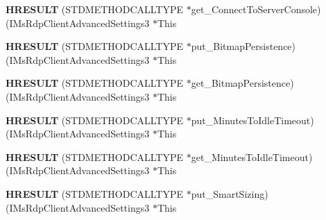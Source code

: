 \begin{DoxyCompactItemize}
\item 
\mbox{\label{struct_i_ms_rdp_client_advanced_settings3_vtbl_a1d1641b79c7c5cf8c25f9c96f7731509}} 
{\bfseries H\+R\+E\+S\+U\+LT} (S\+T\+D\+M\+E\+T\+H\+O\+D\+C\+A\+L\+L\+T\+Y\+PE $\ast$get\+\_\+\+Connect\+To\+Server\+Console)(I\+Ms\+Rdp\+Client\+Advanced\+Settings3 $\ast$This
\item 
\mbox{\label{struct_i_ms_rdp_client_advanced_settings3_vtbl_a71c5797ff242f9ed8fb4dceed7adb61d}} 
{\bfseries H\+R\+E\+S\+U\+LT} (S\+T\+D\+M\+E\+T\+H\+O\+D\+C\+A\+L\+L\+T\+Y\+PE $\ast$put\+\_\+\+Bitmap\+Persistence)(I\+Ms\+Rdp\+Client\+Advanced\+Settings3 $\ast$This
\item 
\mbox{\label{struct_i_ms_rdp_client_advanced_settings3_vtbl_a4e6d8e80dba7d85a6c70778ed2659684}} 
{\bfseries H\+R\+E\+S\+U\+LT} (S\+T\+D\+M\+E\+T\+H\+O\+D\+C\+A\+L\+L\+T\+Y\+PE $\ast$get\+\_\+\+Bitmap\+Persistence)(I\+Ms\+Rdp\+Client\+Advanced\+Settings3 $\ast$This
\item 
\mbox{\label{struct_i_ms_rdp_client_advanced_settings3_vtbl_a1d88bf05c7889331aaee79f8b3cef6f1}} 
{\bfseries H\+R\+E\+S\+U\+LT} (S\+T\+D\+M\+E\+T\+H\+O\+D\+C\+A\+L\+L\+T\+Y\+PE $\ast$put\+\_\+\+Minutes\+To\+Idle\+Timeout)(I\+Ms\+Rdp\+Client\+Advanced\+Settings3 $\ast$This
\item 
\mbox{\label{struct_i_ms_rdp_client_advanced_settings3_vtbl_aaeb05c959edcab0ae63a3f4e72edecc6}} 
{\bfseries H\+R\+E\+S\+U\+LT} (S\+T\+D\+M\+E\+T\+H\+O\+D\+C\+A\+L\+L\+T\+Y\+PE $\ast$get\+\_\+\+Minutes\+To\+Idle\+Timeout)(I\+Ms\+Rdp\+Client\+Advanced\+Settings3 $\ast$This
\item 
\mbox{\label{struct_i_ms_rdp_client_advanced_settings3_vtbl_a287512fce6bf0363d2995cbc64580097}} 
{\bfseries H\+R\+E\+S\+U\+LT} (S\+T\+D\+M\+E\+T\+H\+O\+D\+C\+A\+L\+L\+T\+Y\+PE $\ast$put\+\_\+\+Smart\+Sizing)(I\+Ms\+Rdp\+Client\+Advanced\+Settings3 $\ast$This
\item 
\mbox{\label{struct_i_ms_rdp_client_advanced_settings3_vtbl_a7d988ed69f7f479e2f39fbfac1ef1991}} 

\end{DoxyCompactItemize}
